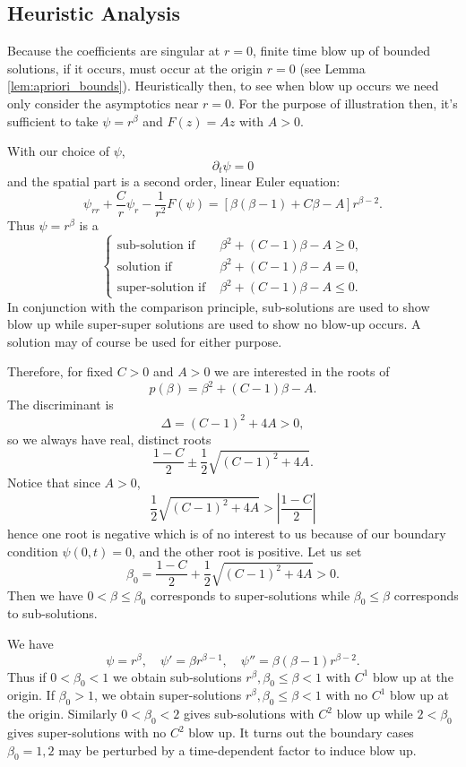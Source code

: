 \documentclass{amsart}
\begin{document}
\subsection{Heuristic Analysis}

Because the coefficients are singular at \(r=0\), finite time blow up of bounded solutions, if it occurs, must occur at the origin \(r = 0\) (see Lemma \ref{lem:apriori_bounds}). Heuristically then, to see when blow up occurs we need only consider the asymptotics near \(r = 0\). For the purpose of illustration then, it's sufficient to take \(\psi = r^{\beta}\) and \(F(z) = A z\) with \(A > 0\).

With our choice of \(\psi\),
\[
\partial_t \psi = 0
\]
and the spatial part is a second order, linear Euler equation:
\[
\psi_{rr} + \frac{C}{r} \psi_r - \frac{1}{r^2} F(\psi) = \left[\beta(\beta-1) + C \beta - A\right]r^{\beta-2}.
\]
Thus \(\psi = r^{\beta}\) is a
\begin{equation}
\label{eq:betasubsuper}
\begin{cases}
\text{sub-solution if } & \beta^2 + (C - 1) \beta - A \geq 0, \\
\text{solution if } & \beta^2 + (C - 1) \beta - A = 0, \\
\text{super-solution if } & \beta^2 + (C - 1) \beta - A \leq 0.
\end{cases}
\end{equation}
In conjunction with the comparison principle, sub-solutions are used to show blow up while super-super solutions are used to show no blow-up occurs. A solution may of course be used for either purpose.

Therefore, for fixed \(C > 0\) and \(A > 0\) we are interested in the roots of
\[
p(\beta) = \beta^2 + (C - 1) \beta - A.
\]
The discriminant is
\[
\Delta = (C-1)^2 + 4 A > 0,
\]
so we always have real, distinct roots
\[
\frac{1 - C}{2} \pm \frac{1}{2} \sqrt{(C-1)^2 + 4 A}.
\]
Notice that since \(A > 0\),
\[
\frac{1}{2} \sqrt{(C-1)^2 + 4 A} > \left|\frac{1-C}{2}\right|
\]
hence one root is negative which is of no interest to us because of our boundary condition \(\psi(0, t) = 0\), and the other root is positive. Let us set
\[
\beta_0 = \frac{1 - C}{2} + \frac{1}{2} \sqrt{(C-1)^2 + 4 A} > 0.
\]
Then we have \(0 < \beta \leq \beta_0\) corresponds to super-solutions while \(\beta_0 \leq \beta\) corresponds to sub-solutions.

We have
\[
\psi = r^{\beta}, \quad \psi' = \beta r^{\beta-1}, \quad \psi'' = \beta(\beta-1) r^{\beta - 2}.
\]
Thus if \(0 < \beta_0 < 1\) we obtain sub-solutions \(r^{\beta}, \beta_0 \leq \beta < 1\) with \(C^1\) blow up at the origin. If \(\beta_0 > 1\), we obtain super-solutions \(r^{\beta}, \beta_0 \leq \beta < 1\) with no \(C^1\) blow up at the origin. Similarly \(0 < \beta_0 < 2\) gives sub-solutions with \(C^2\) blow up while \(2 < \beta_0\) gives super-solutions with no \(C^2\) blow up. It turns out the boundary cases \(\beta_0 = 1, 2\) may be perturbed by a time-dependent factor to induce blow up.
\end{document}
